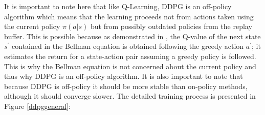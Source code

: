 It is important to note here that like Q-Learning, DDPG is an off-policy algorithm which means that the learning proceeds not from actions taken using the current policy $ \pi(a|s)$ but from possibly outdated policies from the replay buffer. This is possible because as demonstrated in \cite{watkins1989}, the Q-value of the next state $s^{'}$ contained in the Bellman equation is obtained following the greedy action $a^{'}$; it estimates the return for a state-action pair assuming a greedy policy is followed. This is why the Bellman equation is not concerned about the current policy and thus why DDPG is an off-policy algorithm. It is also important to note that because DDPG is off-policy it should be more stable than on-policy methods, although it should converge slower.
\newline
The detailed training process is presented in Figure \ref{ddpggeneral}: \newline


